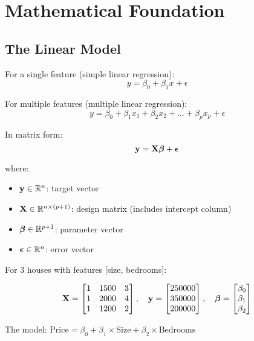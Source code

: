 \documentclass{article}
\newcounter{example}
\begin{document}
\section{Mathematical Foundation}

\subsection{The Linear Model}

For a single feature (simple linear regression):
$$y = \beta_0 + \beta_1 x + \epsilon$$

For multiple features (multiple linear regression):
$$y = \beta_0 + \beta_1 x_1 + \beta_2 x_2 + \ldots + \beta_p x_p + \epsilon$$

In matrix form:
$$\mathbf{y} = \mathbf{X}\boldsymbol{\beta} + \boldsymbol{\epsilon}$$

where:
\begin{itemize}
    \item $\mathbf{y} \in \mathbb{R}^n$: target vector
    \item $\mathbf{X} \in \mathbb{R}^{n \times (p+1)}$: design matrix (includes intercept column)
    \item $\boldsymbol{\beta} \in \mathbb{R}^{p+1}$: parameter vector
    \item $\boldsymbol{\epsilon} \in \mathbb{R}^n$: error vector
\end{itemize}

\begin{tcolorbox}[colback=blue!5!white,colframe=blue!75!black,title=Example \stepcounter{example}\#\theexample: Matrix Representation]

For 3 houses with features [size, bedrooms]:

$$\mathbf{X} = \begin{bmatrix} 
1 & 1500 & 3 \\
1 & 2000 & 4 \\
1 & 1200 & 2
\end{bmatrix}, \quad 
\mathbf{y} = \begin{bmatrix} 
250000 \\
350000 \\
200000
\end{bmatrix}, \quad
\boldsymbol{\beta} = \begin{bmatrix}
\beta_0 \\
\beta_1 \\
\beta_2
\end{bmatrix}$$

The model: $\text{Price} = \beta_0 + \beta_1 \times \text{Size} + \beta_2 \times \text{Bedrooms}$
\end{tcolorbox}
\end{document}
